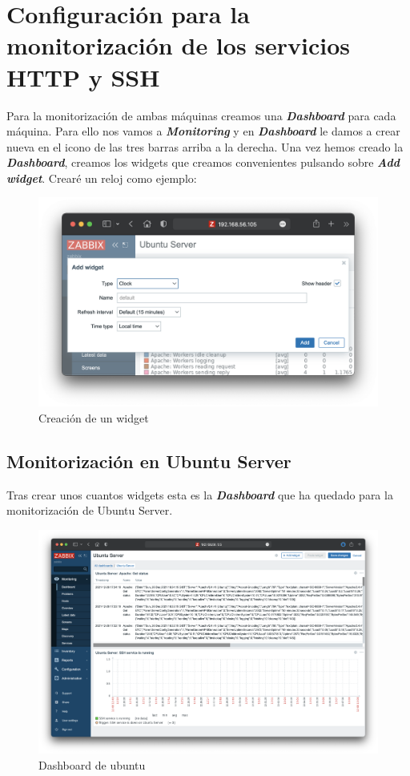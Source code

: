 \section{Configuración para la monitorización de los servicios HTTP y SSH}
Para la monitorización de ambas máquinas creamos una \textbf{\emph{Dashboard}} para cada máquina. Para ello nos vamos a \textbf{\emph{Monitoring}} y en \textbf{\emph{Dashboard}} le damos
a crear nueva en el icono de las tres barras arriba a la derecha. Una vez hemos creado la \textbf{\emph{Dashboard}}, creamos los widgets que creamos convenientes pulsando sobre
\textbf{\emph{Add widget}}. Crearé un reloj como ejemplo:
    \begin{figure}[H]
        \centering
        \includegraphics[scale=0.3]{images/widget.png}
        \caption{Creación de un widget}
        \label{fig:widget}
    \end{figure}

\subsection{Monitorización en Ubuntu Server}
Tras crear unos cuantos widgets esta es la \textbf{\emph{Dashboard}} que ha quedado para la monitorización de Ubuntu Server.
    \begin{figure}[H]
        \centering
        \includegraphics[scale=0.275]{images/ubuntu_dashboard.png}
        \caption{Dashboard de ubuntu}
        \label{fig:ubuntu_dashboard}
    \end{figure}


